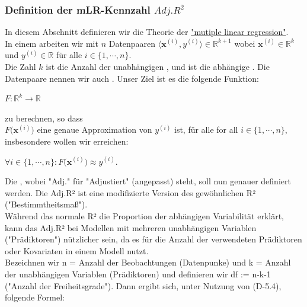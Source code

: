 \documentclass[12pt]{article}
\begin{document}
\subsubsection{Definition der mLR-Kennzahl $Adj.R^2$}
%
In diesem Abschnitt definieren wir die Theorie der \href{https://en.wikipedia.org/wiki/Linear_regression}{"mutiple linear regression"}.\\
In einem {\color{blue}{multiplen Regression Problem}} arbeiten wir mit $n$ Datenpaaren $\langle\mathbf{x}^{(i)}, y^{(i)} \rangle \in \mathbb{R}^{k+1} $ 
wobei $\mathbf{x}^{(i)} \in \mathbb{R}^k$ und $y^{(i)} \in \mathbb{R}$ für alle $i \in \{1,\cdots,n\}$.  \\
Die Zahl $k$ ist die Anzahl der unabhängigen { }, und {} ist die abhängige {\color{blue}{Zielvariable ("target column")}}. Die Datenpaare nennen wir auch {\color{blue}{Trainings-Menge}} . Unser Ziel ist es die folgende Funktion:  
\\[0.2cm]
\hspace*{1.3cm}
\begin{large}
$F:\mathbb{R}^k \rightarrow \mathbb{R}$ 
\end{large} 
zu berechnen, so dass 
\\[0.2cm]  
$ F\bigl(\mathbf{x}^{(i)}\bigr)$ eine  genaue Approximation von $y^{(i)}$ ist,  für alle for all $i\in\{1,\cdots,n\}$, insbesondere wollen wir erreichen: \\[0.3cm]
\hspace*{1.3cm}
\begin{large}
$\forall i\in\{1,\cdots,n\}:F\bigl(\mathbf{x}^{(i)}\bigr) \approx y^{(i)}$. \\[0.4cm]
\end{large}
%
Die {\color{blue}{Kennzahl $Adj.R^2$}} , wobei "Adj." für "Adjustiert" (angepasst) steht, soll nun genauer definiert werden. Die Adj.R² ist eine modifizierte Version des gewöhnlichen R² ("Bestimmtheitsmaß").\\
Während das normale R² die Proportion der abhängigen Variabilität erklärt, kann das Adj.R² bei Modellen mit mehreren unabhängigen Variablen ("Prädiktoren") nützlicher sein, da es für die Anzahl der verwendeten Prädiktoren oder Kovariaten in einem Modell nutzt.\\
Bezeichnen wir n = Anzahl der Beobachtungen (Datenpunke) und k = Anzahl der unabhängigen Variablen (Prädiktoren) und definieren wir df := n-k-1 ("Anzahl der Freiheitsgrade"). Dann ergibt sich, unter Nutzung von (D-5.4), folgende Formel:\\[0.1cm]
\end{document}
